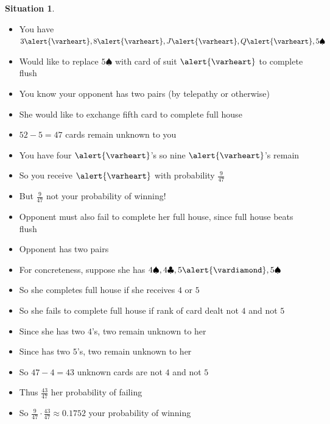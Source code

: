 \documentclass[handout]{beamer}
\theoremstyle{definition}
\newtheorem{situation}{Situation}
\newcommand{\hs}{\alert{\varheart}}
\newcommand{\ds}{\alert{\vardiamond}}
\newcommand{\s}{\spadesuit}
\newcommand{\cs}{\clubsuit}
\begin{document}
\begin{frame}
\begin{situation}
\begin{itemize}
\item You have $3\hs,8\hs,J\hs,Q\hs,5\s$
\item Would like to replace $5\s$ with card of suit $\hs$ to complete flush
\item You know your opponent has two pairs (by telepathy or otherwise)
\item She would like to exchange fifth card to complete full house
\end{itemize}
\end{situation}
\begin{itemize}
\item $52-5=47$ cards remain unknown to you
\item You have four $\hs$'s so nine $\hs$'s remain
\item So you receive $\hs$ with probability $\frac{9}{47}$
\item But $\frac{9}{47}$ \alert{not} your probability of winning!
\item Opponent must also \alert{fail} to complete her full house,
since full house beats flush
\end{itemize}
\end{frame}

\begin{frame}
\begin{itemize}
\item Opponent has two pairs
\item For concreteness, suppose she has $4\s,4\cs,5\ds,5\s$
\item So she completes full house if she receives $4$ or $5$
\item So she \alert{fails} to complete full house
if rank of card dealt not $4$ \alert{and} not $5$
\item Since she has two $4$'s, two remain unknown to her
\item Since has two $5$'s, two remain unknown to her
\item So $47-4=43$ unknown cards are not $4$ and not $5$
\item Thus $\frac{43}{47}$ her probability of failing
\item So $\frac{9}{47}\cdot\frac{43}{47}\approx 0.1752$
your probability of winning
\end{itemize}
\end{frame}
\end{document}
